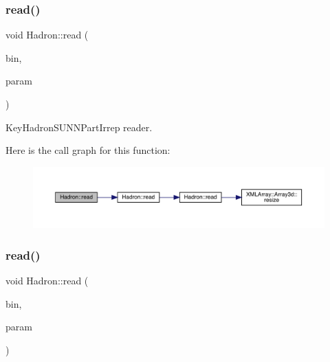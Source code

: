\subsubsection{\texorpdfstring{read()}{read()}\hspace{0.1cm}{\footnotesize\ttfamily [83/94]}}
{\footnotesize\ttfamily void Hadron\+::read (\begin{DoxyParamCaption}\item[{\mbox{\hyperlink{classADATIO_1_1BinaryReader}{Binary\+Reader}} \&}]{bin,  }\item[{\mbox{\hyperlink{structHadron_1_1KeyHadronSUNNPartIrrepOp__t}{Key\+Hadron\+S\+U\+N\+N\+Part\+Irrep\+Op\+\_\+t}} \&}]{param }\end{DoxyParamCaption})}



Key\+Hadron\+S\+U\+N\+N\+Part\+Irrep reader. 

Here is the call graph for this function\+:
\nopagebreak
\begin{figure}[H]
\begin{center}
\leavevmode
\includegraphics[width=350pt]{d1/daf/namespaceHadron_a05878acca51117e3c410ba16500c4ba5_cgraph}
\end{center}
\end{figure}
\mbox{\label{namespaceHadron_a205a666e574892fd5fc22e723a24399e}} 
\subsubsection{\texorpdfstring{read()}{read()}\hspace{0.1cm}{\footnotesize\ttfamily [84/94]}}
{\footnotesize\ttfamily void Hadron\+::read (\begin{DoxyParamCaption}\item[{\mbox{\hyperlink{classADATIO_1_1BinaryReader}{Binary\+Reader}} \&}]{bin,  }\item[{\mbox{\hyperlink{structHadron_1_1KeyHadronNPartIrrepOp__t}{Key\+Hadron\+N\+Part\+Irrep\+Op\+\_\+t}} \&}]{param }\end{DoxyParamCaption})}



